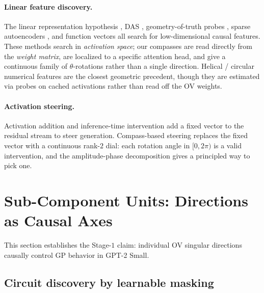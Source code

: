 \paragraph{Linear feature discovery.} The linear representation
hypothesis \citep{park2024linearrep}, DAS
\citep{geiger2024das}, geometry-of-truth probes
\citep{marks2024geometry}, sparse autoencoders
\citep{cunningham2023sparse,templeton2024scaling}, and function
vectors \citep{todd2024function} all search for low-dimensional
causal features. These methods search in \emph{activation space};
our compasses are read directly from the \emph{weight matrix}, are
localized to a specific attention head, and give a continuous
family of $\theta$-rotations rather than a single direction.
Helical / circular numerical features \citep{engels2024not} are
the closest geometric precedent, though they are estimated via
probes on cached activations rather than read off the OV weights.

\paragraph{Activation steering.} Activation addition
\citep{turner2023actadd} and inference-time intervention
\citep{li2023inference} add a fixed vector to the residual stream
to steer generation. Compass-based steering replaces the fixed
vector with a continuous rank-$2$ dial: each rotation angle in
$[0, 2\pi)$ is a valid intervention, and the amplitude-phase
decomposition gives a principled way to pick one.

\section{Sub-Component Units: Directions as Causal Axes}
\label{sec:bc}

This section establishes the Stage-$1$ claim: individual OV
singular directions causally control GP behavior in GPT-2 Small.

\subsection{Circuit discovery by learnable masking}
\label{sec:bc_mask}

